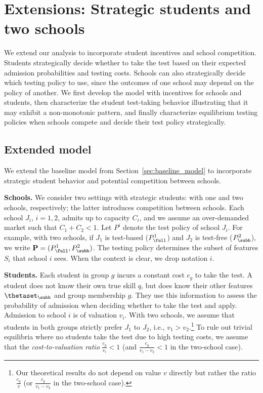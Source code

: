 \section{Extensions: Strategic students and two schools}
\label{sec:strategic}




We extend our analysis to incorporate student incentives and school competition. Students strategically decide whether to take the test based on their expected admission probabilities and testing costs. Schools can also strategically decide which testing policy to use, since the outcomes of one school may depend on the policy of another. We first develop the model with incentives for schools and students, then characterize the student test-taking behavior illustrating that it may exhibit a non-monotonic pattern, and finally characterize equilibrium testing policies when schools compete and decide their test policy strategically.







\subsection{Extended model}

We extend the baseline model from Section~\ref{sec:baseline_model} to incorporate strategic student behavior and potential competition between schools.


\smallskip
\noindent\textbf{Schools.}
We consider two settings with strategic students: with one and two schools, respectively; the latter introduces competition between schools.
Each school $J_i$, $i=1,2$, admits up to capacity $C_i$, and we assume an over-demanded market such that $C_1 + C_2 <1$.
Let $P^i$ denote the test policy of school $J_i$. For example, with two schools, if $J_1$ is test-based ($P^1_{\full}$) and $J_2$ is test-free ($P^2_{\subb}$), we write $\mathbf P=(P^1_{\full},P^2_{\subb})$. The testing policy determines the subset of features $S_i$ that school $i$ sees.  When the context is clear, we drop notation $i$.




\smallskip
\noindent\textbf{Students.}
Each student in group $g$ incurs a constant cost $c_g$ to take the test. A student does not know their own true skill $q$, but does know their other features $\thetaset_{\subb}$ and group membership $g$. They use this information to assess the probability of admission when deciding whether to take the test and apply.
Admission to school $i$ is of valuation $v_i$. With two schools, we assume that students in both groups strictly prefer $J_1$ to $J_2$, i.e., $v_1>v_2$.\footnote{Our theoretical results do not depend on value $v$ directly but rather the ratio $\frac{c_g}{v}$ (or $\frac{c_g}{v_1 - v_2}$ in the two-school case).}
To rule out trivial equilibria where no students take the test due to high testing costs, we assume that the \textit{cost-to-valuation ratio} $\frac{c_g}{v_i} < 1$ (and $\frac{c_g}{v_1 - v_2}<1$ in the two-school case).

